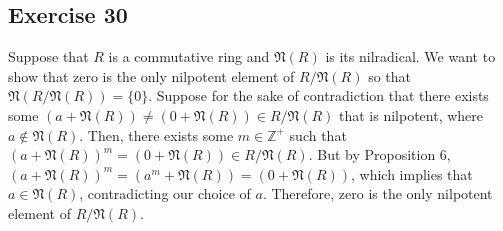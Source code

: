 \subsection*{Exercise 30}
Suppose that $R$ is a commutative ring and $\mathfrak{N}(R)$ is its nilradical. We want to show that zero is the only nilpotent element of $R/\mathfrak{N}(R)$ so that $\mathfrak{N}(R/\mathfrak{N}(R)) = \{0\}$. Suppose for the sake of contradiction that there exists some $(a + \mathfrak{N}(R)) \not= (0 + \mathfrak{N}(R)) \in R/\mathfrak{N}(R)$ that is nilpotent, where $a \not\in \mathfrak{N}(R)$. Then, there exists some $m \in \mathbb{Z}^+$ such that $(a + \mathfrak{N}(R))^m = (0 + \mathfrak{N}(R)) \in R/\mathfrak{N}(R)$. But by Proposition 6, $(a + \mathfrak{N}(R))^m = (a^m + \mathfrak{N}(R)) = (0 + \mathfrak{N}(R))$, which implies that $a \in \mathfrak{N}(R)$, contradicting our choice of $a$. Therefore, zero is the only nilpotent element of $R/\mathfrak{N}(R)$.